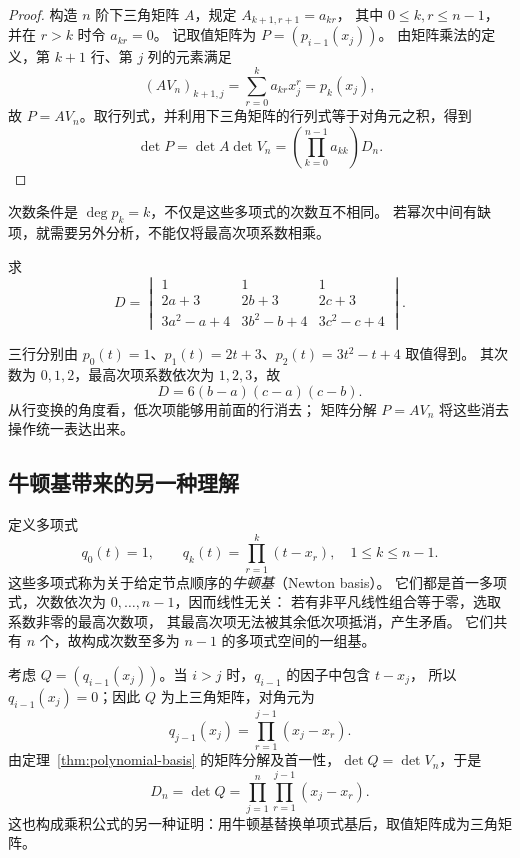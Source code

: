 \documentclass[UTF8,12pt,a4paper,fontset=fandol]{ctexart}
\begin{document}
\begin{proof}
构造 $n$ 阶下三角矩阵 $A$，规定 $A_{k+1,r+1}=a_{kr}$，
其中 $0\leq k,r\leq n-1$，并在 $r>k$ 时令 $a_{kr}=0$。
记取值矩阵为 $P=(p_{i-1}(x_j))$。
由矩阵乘法的定义，第 $k+1$ 行、第 $j$ 列的元素满足
\[
  (AV_n)_{k+1,j}=\sum_{r=0}^{k}a_{kr}x_j^r=p_k(x_j),
\]
故 $P=AV_n$。取行列式，并利用下三角矩阵的行列式等于对角元之积，得到
\[
  \det P=\det A\det V_n
  =\left(\prod_{k=0}^{n-1}a_{kk}\right)D_n.
\]
\end{proof}

次数条件是 $\deg p_k=k$，不仅是这些多项式的次数互不相同。
若幂次中间有缺项，就需要另外分析，不能仅将最高次项系数相乘。

\begin{example}[低次项不影响结果]
求
\[
  D=\begin{vmatrix}
    1&1&1\\
    2a+3&2b+3&2c+3\\
    3a^2-a+4&3b^2-b+4&3c^2-c+4
  \end{vmatrix}.
\]
\end{example}

\begin{solve}
三行分别由 $p_0(t)=1$、$p_1(t)=2t+3$、$p_2(t)=3t^2-t+4$ 取值得到。
其次数为 $0,1,2$，最高次项系数依次为 $1,2,3$，故
\[
  D=6(b-a)(c-a)(c-b).
\]
从行变换的角度看，低次项能够用前面的行消去；
矩阵分解 $P=AV_n$ 将这些消去操作统一表达出来。
\end{solve}

\subsection{牛顿基带来的另一种理解}

定义多项式
\[
  q_0(t)=1,\qquad q_k(t)=\prod_{r=1}^{k}(t-x_r),\quad 1\leq k\leq n-1.
\]
这些多项式称为关于给定节点顺序的\emph{牛顿基}（Newton basis）。
它们都是首一多项式，次数依次为 $0,\ldots,n-1$，因而线性无关：
若有非平凡线性组合等于零，选取系数非零的最高次数项，
其最高次项无法被其余低次项抵消，产生矛盾。
它们共有 $n$ 个，故构成次数至多为 $n-1$ 的多项式空间的一组基。

考虑 $Q=(q_{i-1}(x_j))$。当 $i>j$ 时，$q_{i-1}$ 的因子中包含 $t-x_j$，
所以 $q_{i-1}(x_j)=0$；因此 $Q$ 为上三角矩阵，对角元为
\[
  q_{j-1}(x_j)=\prod_{r=1}^{j-1}(x_j-x_r).
\]
由定理~\ref{thm:polynomial-basis} 的矩阵分解及首一性，$\det Q=\det V_n$，于是
\[
  D_n=\det Q=\prod_{j=1}^n\prod_{r=1}^{j-1}(x_j-x_r).
\]
这也构成乘积公式的另一种证明：用牛顿基替换单项式基后，取值矩阵成为三角矩阵。
\end{document}
